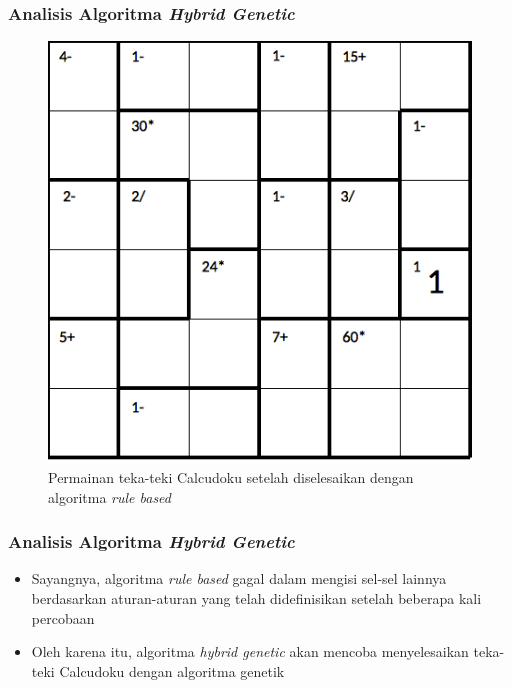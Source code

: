 \documentclass{beamer}
\begin{document}
\begin{frame}
\frametitle{Analisis Algoritma \textit{Hybrid Genetic}}
\begin{figure}
\centering
\captionsetup{justification=centering}
\includegraphics[scale=0.333]{Gambar/hybridgenetic/PuzzleAfterRuleBased}
\caption[Permainan teka-teki Calcudoku setelah diselesaikan dengan algoritma \textit{rule based}]{Permainan teka-teki Calcudoku setelah diselesaikan dengan algoritma \textit{rule based}}
\label{fig:analisishg2}
\end{figure}
\end{frame}

\note{

}

\begin{frame}
\frametitle{Analisis Algoritma \textit{Hybrid Genetic}}
\begin{itemize}
\item Sayangnya, algoritma \textit{rule based} gagal dalam mengisi sel-sel lainnya berdasarkan aturan-aturan yang telah didefinisikan setelah beberapa kali percobaan
\item Oleh karena itu, algoritma \textit{hybrid genetic} akan mencoba menyelesaikan teka-teki Calcudoku dengan algoritma genetik
\end{itemize}
\end{frame}

\end{document}
